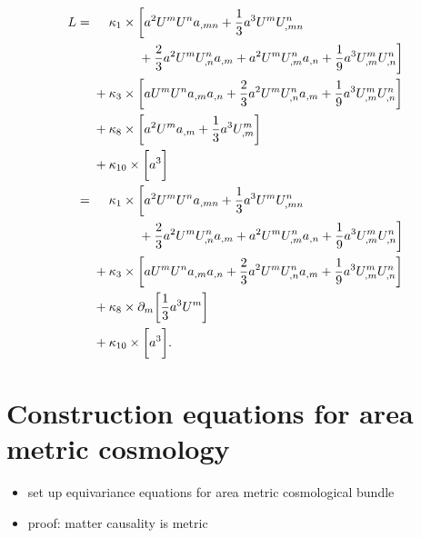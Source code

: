 \begin{equation}
  \begin{aligned}
    L = {} & \mathbin{\hphantom{+}} \kappa_1 \times \bigg\lbrack a^2 U^m U^n a_{,mn} + \frac{1}{3} a^3 U^m U^n_{,mn} \\ {} & \hphantom{+ \kappa_1 \times \bigg\lbrack } + \frac{2}{3} a^2 U^m U^n_{,n} a_{,m} + a^2 U^m U^n_{,m} a_{,n} + \frac{1}{9} a^3 U^m_{,m} U^n_{,n} \bigg\rbrack \\
    {} & + \kappa_3 \times \bigg\lbrack a U^m U^n a_{,m} a_{,n} + \frac{2}{3} a^2 U^m U^n_{,n} a_{,m} + \frac{1}{9} a^3 U^m_{,m} U^n_{,n}\bigg\rbrack \\
    {} & + \kappa_8 \times \bigg\lbrack a^2 U^m a_{,m} + \frac{1}{3} a^3 U^m_{,m} \bigg\rbrack \\
    {} & + \kappa_{10} \times \bigg\lbrack a^3 \bigg\rbrack \\
      = {} & \mathbin{\hphantom{+}} \kappa_1 \times \bigg\lbrack a^2 U^m U^n a_{,mn} + \frac{1}{3} a^3 U^m U^n_{,mn} \\ {} & \hphantom{+ \kappa_1 \times \bigg\lbrack } + \frac{2}{3} a^2 U^m U^n_{,n} a_{,m} + a^2 U^m U^n_{,m} a_{,n} + \frac{1}{9} a^3 U^m_{,m} U^n_{,n} \bigg\rbrack \\
    {} & + \kappa_3 \times \bigg\lbrack a U^m U^n a_{,m} a_{,n} + \frac{2}{3} a^2 U^m U^n_{,n} a_{,m} + \frac{1}{9} a^3 U^m_{,m} U^n_{,n}\bigg\rbrack \\
    {} & + \kappa_8 \times \partial_m \bigg\lbrack \frac{1}{3} a^3 U^m \bigg\rbrack \\
    {} & + \kappa_{10} \times \bigg\lbrack a^3 \bigg\rbrack.
  \end{aligned}
\end{equation}

\newpage

\section{Construction equations for area metric cosmology}
\begin{itemize}
\item set up equivariance equations for area metric cosmological bundle
\item proof: matter causality is metric
\end{itemize}

